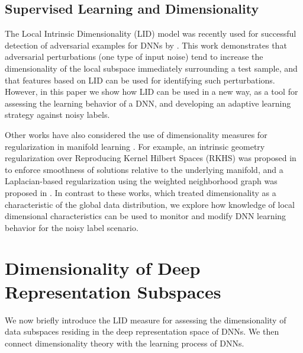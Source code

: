 \documentclass{article}
\begin{document}
\subsection{Supervised Learning and Dimensionality}

The Local Intrinsic Dimensionality (LID) model \cite{houle2017local1} was recently used for successful detection of adversarial examples for DNNs by \cite{ma2018characterizing}. This work demonstrates that adversarial perturbations (one type of input noise) tend to increase the dimensionality of the local subspace immediately surrounding a test sample, and that features based on LID can be used for identifying such perturbations.
However, in this paper we show how LID can be used in a new way, as a tool for assessing the learning behavior of a DNN, and developing an adaptive learning strategy against noisy labels.

Other works have also considered the use of dimensionality measures for regularization in manifold learning \cite{roweis2000nonlinear,belkin2004regularization,belkin2006manifold}. For example, an intrinsic geometry regularization over Reproducing Kernel Hilbert Spaces (RKHS) was proposed in \cite{belkin2006manifold} to enforce smoothness of solutions relative to the underlying manifold, and a Laplacian-based regularization using the weighted neighborhood graph was proposed in \cite{belkin2004regularization}. In contrast to these works, which treated dimensionality as a characteristic of the global data distribution, we explore how knowledge of local dimensional characteristics can be used to monitor and modify DNN learning behavior for the noisy label scenario. 






\section{Dimensionality of Deep Representation Subspaces}
We now briefly introduce the LID measure for assessing the dimensionality of data subspaces residing in the deep representation space of DNNs. We then connect dimensionality theory with the learning process of DNNs.
\end{document}

